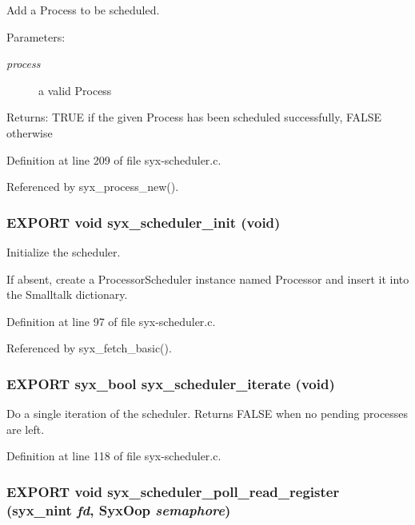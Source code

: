 Add a Process to be scheduled. \begin{Desc}
\item[Parameters:]
\begin{description}
\item[{\em process}]a valid Process \end{description}
\end{Desc}
\begin{Desc}
\item[Returns:]TRUE if the given Process has been scheduled successfully, FALSE otherwise \end{Desc}


Definition at line 209 of file syx-scheduler.c.

Referenced by syx\_\-process\_\-new().\hypertarget{syx-scheduler_8h_dabe27943d73201de5aecf72519a687a}{
\subsubsection{\setlength{\rightskip}{0pt plus 5cm}EXPORT void syx\_\-scheduler\_\-init (void)}}
\label{syx-scheduler_8h_dabe27943d73201de5aecf72519a687a}


Initialize the scheduler.

If absent, create a ProcessorScheduler instance named Processor and insert it into the Smalltalk dictionary. 

Definition at line 97 of file syx-scheduler.c.

Referenced by syx\_\-fetch\_\-basic().\hypertarget{syx-scheduler_8h_17fade7b245e355201d773d0ba2286e0}{
\subsubsection{\setlength{\rightskip}{0pt plus 5cm}EXPORT {\bf syx\_\-bool} syx\_\-scheduler\_\-iterate (void)}}
\label{syx-scheduler_8h_17fade7b245e355201d773d0ba2286e0}


Do a single iteration of the scheduler. Returns FALSE when no pending processes are left. 

Definition at line 118 of file syx-scheduler.c.\hypertarget{syx-scheduler_8h_599aa809cfc6c0074cc0736fd3ec64f7}{
\subsubsection{\setlength{\rightskip}{0pt plus 5cm}EXPORT void syx\_\-scheduler\_\-poll\_\-read\_\-register ({\bf syx\_\-nint} {\em fd}, \/  {\bf SyxOop} {\em semaphore})}}
\label{syx-scheduler_8h_599aa809cfc6c0074cc0736fd3ec64f7}


